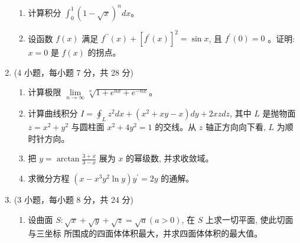 \begin{enumerate}
\begin{enumerate}
	
	\item
	计算积分 $\int_{0}^{1}(1-\sqrt{x})^{n} d x$。
	
	
	\item
	设函数 $f(x)$ 满足 $f^{\prime \prime}(x)+\left[f^{\prime}(x)\right]^{2}=\sin x$, 且 $f^{\prime}(0)=0$ 。证明: $x=0$ 是 $f(x)$ 的拐点。
	
	
	
	
\end{enumerate}


\banswer{
	
}



\item 
(4 小题，每小题 7 分，共 28 分)
\begin{enumerate}
	\item
计算极限 $\lim\limits _{n \rightarrow \infty} \sqrt[n]{1+e^{n x}+e^{-n x}}$。
	
	
	\item
	计算曲线积分 $I=\oint_{L} z^{2} d x+\left(x^{2}+x y-x\right) d y+2 x z d z$, 其中 $L$ 是抛物面 $z=x^{2}+y^{2}$ 与圆柱面 $x^{2}+4 y^{2}=1$ 的交线。从 $z$ 轴正方向向下看, $L$ 为顺时针方向。
	
	
	\item
	把 $y=\arctan \frac{3+x}{3-x}$ 展为 $x$ 的幂级数, 并求收敛域。
	
	
	\item
	求微分方程 $\left(x-x^{3} y^{2} \ln y\right) y^{\prime}=2 y$ 的通解。
	
	
	
	
\end{enumerate}

\banswer{
	
}


\newpage
\item 
(3 小题，每小题 8 分，共 24 分)
\begin{enumerate}
	\item
设曲面 $S: \sqrt{x}+\sqrt{y}+\sqrt{z}=\sqrt{a}(a>0)$, 在 $S$ 上求一切平面, 使此切面与三坐标 所围成的四面体体积最大，并求四面体体积的最大值。
	

\end{enumerate}
\end{enumerate}
